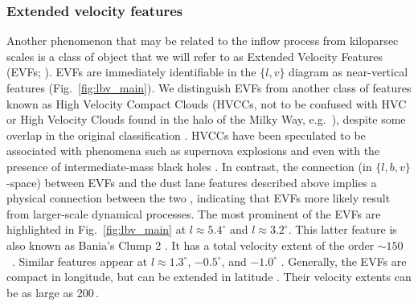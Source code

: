 \subsubsection{Extended velocity features}\label{sec:EVFs}

Another phenomenon that may be related to the inflow process from kiloparsec scales is a class of object that we will refer to as Extended Velocity Features (EVFs; \citealp{Sormani2019a}). EVFs are immediately identifiable in the $\{l,v\}$ diagram as near-vertical features (Fig.~\ref{fig:lbv_main}). We distinguish EVFs from another class of features known as High Velocity Compact Clouds (HVCCs, not to be confused with HVC or High Velocity Clouds found in the halo of the Milky Way, e.g.~\citealt{Wakker1997}), despite some overlap in the original classification \citep[HVCCs are similar in that many appear as near-vertical emission features in $\{l,v\}$ diagrams;][]{Oka1998b}. HVCCs have been speculated to be associated with phenomena such as supernova explosions \citep{Oka1999} and even with the presence of intermediate-mass black holes \citep[IMBHs;][]{Oka2016, Oka2017, Takekawa2017b, Tokuyama2019}. In contrast, the connection (in $\{l,b,v\}$-space) between EVFs and the dust lane features described above implies a physical connection between the two \citep{Liszt2008}, indicating that EVFs more likely result from larger-scale dynamical processes. The most prominent of the EVFs are highlighted in Fig.~\ref{fig:lbv_main} at $l\approx5.4^{\circ}$ and $l\approx3.2^{\circ}$. This latter feature is also known as Bania's Clump 2 \citep{Bania1977}. It has a total velocity extent of the order $\sim150$\,\kms \ \citep{Stark1986, Longmore2017}. Similar features appear at $l\approx1.3^{\circ}$, $-0.5^{\circ}$, and $-1.0^{\circ}$ \citep{Liszt2006}. Generally, the EVFs are compact in longitude, but can be extended in latitude \citep[in some cases by over 100\,pc;][]{Liszt2006}. Their velocity extents can be as large as 200\,\kms. 

